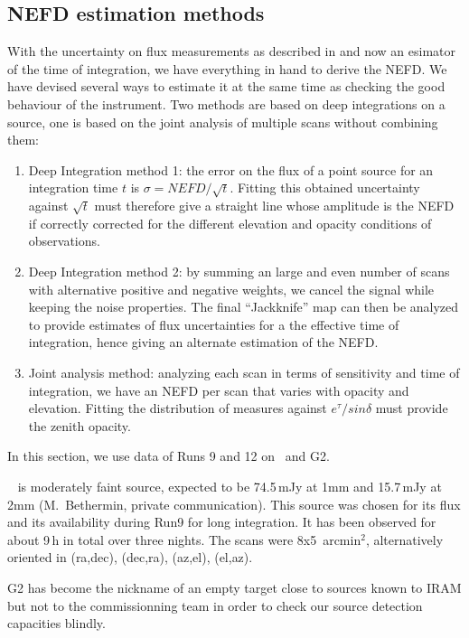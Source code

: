 \subsection{NEFD estimation methods}

With the uncertainty on flux measurements as described in  and
now an esimator of the time of integration, we have everything in hand to derive
the NEFD. We have devised several ways to estimate it at the same time as
checking the good behaviour of the instrument. Two methods are based on deep
integrations on a source, one is based on the joint analysis of multiple scans
without combining them:

\begin{enumerate}
\item Deep Integration method 1: the error on the flux of a point source for an
  integration time $t$ is $\sigma = NEFD/\sqrt{t}$. Fitting this obtained
  uncertainty against $\sqrt{t}$ must therefore give a straight line whose
  amplitude is the NEFD if correctly corrected for the different elevation and
  opacity conditions of observations.
\item Deep Integration method 2: by summing an large and even number of scans
  with alternative positive and negative weights, we cancel the signal while
  keeping the noise properties. The final ``Jackknife'' map can then be analyzed
  to provide estimates of flux uncertainties for a the effective time of
  integration, hence giving an alternate estimation of the NEFD.
\item Joint analysis method: analyzing each scan in terms of sensitivity and
  time of integration, we have an NEFD per scan that varies with opacity and
  elevation. Fitting the distribution of measures against $e^\tau/sin\delta$
  must provide the zenith opacity.
\end{enumerate}

In this section, we use data of Runs 9 and 12  on \hls\ and G2.

\hls\ \cite{hls_combes} is moderately faint source, expected to be 74.5\,mJy at
1mm and 15.7\,mJy at 2mm (M.~Bethermin, private communication). This source was
chosen for its flux and its availability during Run9 for long integration. It
has been observed for about 9\,h in total over three nights. The scans were
8x5~arcmin$^2$, alternatively oriented in (ra,dec), (dec,ra), (az,el),
(el,az).

G2 has become the nickname of an empty target close to sources known to IRAM but
not to the commissionning team in order to check our source detection capacities blindly.


